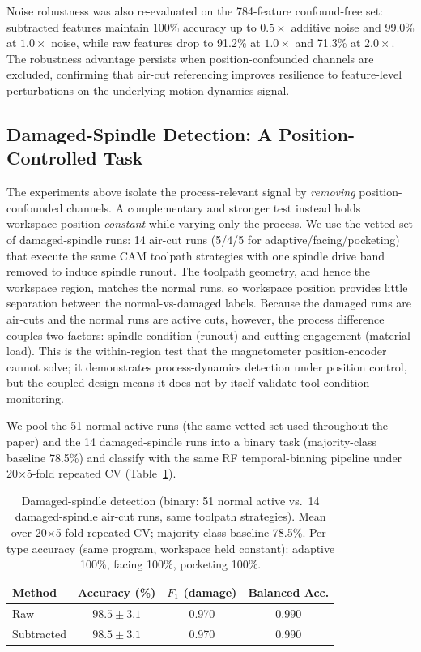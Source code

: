 Noise robustness was also re-evaluated on the 784-feature confound-free set: subtracted features maintain 100\% accuracy up to $0.5\times$ additive noise and 99.0\% at $1.0\times$ noise, while raw features drop to 91.2\% at $1.0\times$ and 71.3\% at $2.0\times$. The robustness advantage persists when position-confounded channels are excluded, confirming that air-cut referencing improves resilience to feature-level perturbations on the underlying motion-dynamics signal.

\subsection{Damaged-Spindle Detection: A Position-Controlled Task}\label{sec:damage}

The experiments above isolate the process-relevant signal by \emph{removing} position-confounded channels. A complementary and stronger test instead holds workspace position \emph{constant} while varying only the process. We use the vetted set of damaged-spindle runs: 14 air-cut runs (5/4/5 for adaptive/facing/pocketing) that execute the same CAM toolpath strategies with one spindle drive band removed to induce spindle runout. The toolpath geometry, and hence the workspace region, matches the normal runs, so workspace position provides little separation between the normal-vs-damaged labels. Because the damaged runs are air-cuts and the normal runs are active cuts, however, the process difference couples two factors: spindle condition (runout) and cutting engagement (material load). This is the within-region test that the magnetometer position-encoder cannot solve; it demonstrates process-dynamics detection under position control, but the coupled design means it does not by itself validate tool-condition monitoring.

We pool the 51 normal active runs (the same vetted set used throughout the paper) and the 14 damaged-spindle runs into a binary task (majority-class baseline 78.5\%) and classify with the same RF temporal-binning pipeline under 20$\times$5-fold repeated CV (Table~\ref{tab:damage}).

\begin{table}[H]
\caption{Damaged-spindle detection (binary: 51 normal active vs.\ 14 damaged-spindle air-cut runs, same toolpath strategies). Mean over 20$\times$5-fold repeated CV; majority-class baseline 78.5\%. Per-type accuracy (same program, workspace held constant): adaptive 100\%, facing 100\%, pocketing 100\%.}\label{tab:damage}
\centering
\begin{tabular}{lccc}
\toprule
\textbf{Method} & \textbf{Accuracy (\%)} & \textbf{$F_1$ (damage)} & \textbf{Balanced Acc.} \\
\midrule
Raw        & $98.5 \pm 3.1$ & 0.970 & 0.990 \\
Subtracted & $98.5 \pm 3.1$ & 0.970 & 0.990 \\
\bottomrule
\end{tabular}
\end{table}

